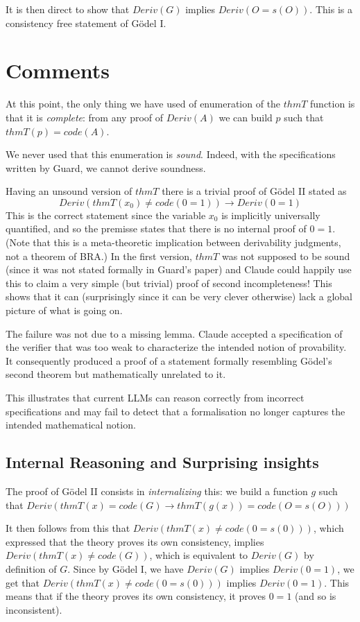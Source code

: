 \documentclass[11pt]{article}
\theoremstyle{plain}
\theoremstyle{definition}
\theoremstyle{remark}
\newcommand{\rta}{\rightarrow}
\begin{document}
It is then direct to show that $Deriv(G)$ implies $Deriv(O=s(O))$. This is a consistency free
statement of G\"odel I.

\section{Comments}

At this point, the only thing we have used of enumeration of the $thmT$ function is that
it is {\em complete}: from any proof of $Deriv(A)$ we can build $p$ such that $thmT(p) = code(A)$.

We never used that this enumeration is {\em sound}. Indeed, with the specifications written
by Guard, we cannot derive soundness.

Having an unsound version of $thmT$ there is a trivial proof of G\"odel II stated
as
$$Deriv(thmT(x_0)\neq code(0=1))\rta Deriv(0=1)$$
This is the correct statement since the variable $x_0$ is implicitly universally quantified, and so the premisse
states that there is no internal proof of $0=1$.
(Note that this is a meta-theoretic implication between derivability judgments, not a theorem of BRA.)
In the first version, $thmT$ was not supposed to be sound (since it was not stated formally in Guard's paper)
and Claude could happily use this to claim a very simple
(but trivial) proof of second incompleteness! This shows that it can (surprisingly since it can be very
clever otherwise) lack a global picture of what is going on.

The failure was not due to a missing lemma.
Claude accepted a specification of the verifier that was too weak to characterize the intended notion of provability.
It consequently produced a proof of a statement
formally resembling G\"odel's second theorem but mathematically unrelated to it.

This illustrates that current LLMs can reason correctly from incorrect specifications and may fail to detect that a formalisation
no longer captures the intended mathematical notion.

\subsection{Internal Reasoning and Surprising insights}

The proof of G\"odel II consists in {\em internalizing} this: we build a function $g$
such that $Deriv(thmT(x) = code(G) \rta thmT(g(x)) = code(O=s(O)))$

It then follows from this that $Deriv(thmT(x)\neq code(0=s(0)))$, which expressed that
the theory proves its own consistency, implies $Deriv(thmT(x)\neq code(G))$, which is equivalent
to $Deriv(G)$ by definition of $G$. Since by G\"odel I, we have $Deriv(G)$ implies $Deriv(0=1)$,
we get that $Deriv(thmT(x)\neq code(0=s(0)))$ implies $Deriv(0=1)$. This means that if the theory
proves its own consistency, it proves $0=1$ (and so is inconsistent).
\end{document}
